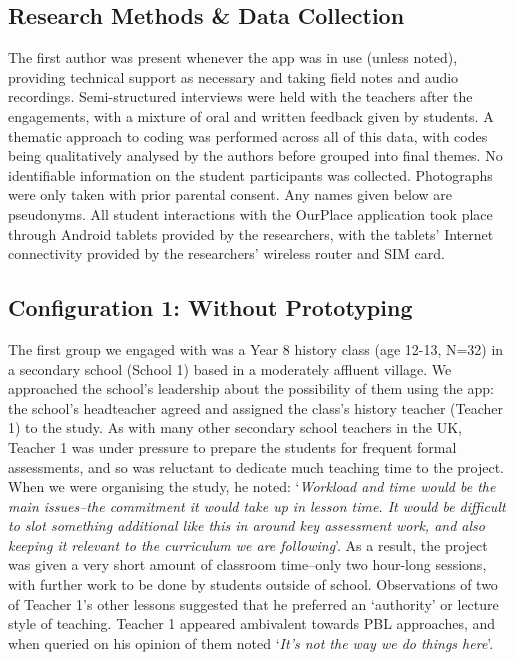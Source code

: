 \documentclass[,hyphens]{sigchi}
\begin{document}
\subsection{Research Methods \& Data Collection}

The first author was present whenever the app was in use (unless noted), providing technical support as necessary and taking field notes and audio recordings. Semi-structured interviews were held with the teachers after the engagements, with a mixture of oral and written feedback given by students. A thematic approach to coding was performed across all of this data, with codes being qualitatively analysed by the authors before grouped into final themes. No identifiable information on the student participants was collected. Photographs were only taken with prior parental consent. Any names given below are pseudonyms. All student interactions with the OurPlace application took place through Android tablets provided by the researchers, with the tablets' Internet connectivity provided by the researchers' wireless router and SIM card.

\subsection{Configuration 1: Without Prototyping}
The first group we engaged with was a Year 8 history class (age 12-13, N=32) in a secondary school (School 1) based in a moderately affluent village. We approached the school's leadership about the possibility of them using the app: the school's headteacher agreed and assigned the class's history teacher (Teacher 1) to the study. As with many other secondary school teachers in the UK, Teacher 1 was under pressure to prepare the students for frequent formal assessments, and so was reluctant to dedicate much teaching time to the project. When we were organising the study, he noted: `\textit{Workload and time would be the main issues--the commitment it would take up in lesson time. It would be difficult to slot something additional like this in around key assessment work, and also keeping it relevant to the curriculum we are following}'. As a result, the project was given a very short amount of classroom time--only two hour-long sessions, with further work to be done by students outside of school. Observations of two of Teacher 1's other lessons suggested that he preferred an `authority' or lecture style of teaching. Teacher 1 appeared ambivalent towards PBL approaches, and when queried on his opinion of them noted `\textit{It's not the way we do things here}'.
\end{document}
